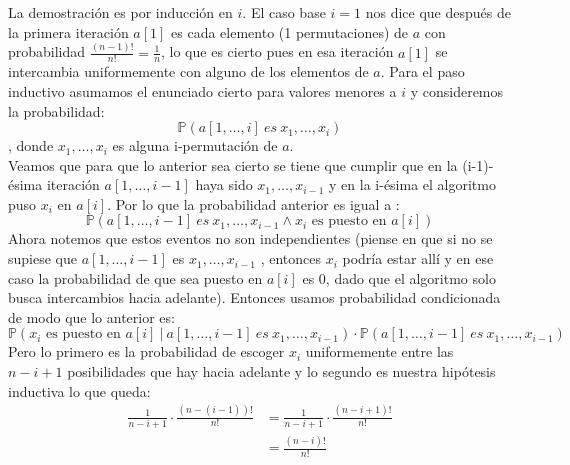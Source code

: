 \documentclass[dcc,uchile]{fcfmcourse}
\begin{document}
\begin{problems}
\begin{enumerate}[a)]
        La demostración es por inducción en $i$. El caso base $i=1$ nos dice que después de la primera iteración $a[1]$ es cada elemento (1 permutaciones) de $a$ con probabilidad $\frac{(n-1)!}{n!} = \frac{1}{n}$, lo que es cierto pues en esa iteración $a[1]$ se intercambia uniformemente con alguno de los elementos de $a$. Para el paso inductivo asumamos el enunciado cierto para valores menores a $i$ y consideremos la probabilidad:
        \begin{equation*}
            \mathbb{P}\left(a[1,\ldots,i]\ es\ x_{1},\ldots,x_{i}\right)
        \end{equation*}
        , donde $x_{1},\ldots,x_{i}$ es alguna i-permutación de $a$.\\
        Veamos que para que lo anterior sea cierto se tiene que cumplir que en la (i-1)-ésima iteración $a[1,\ldots,i-1]$ haya sido $x_{1},\ldots,x_{i-1}$ y en la i-ésima  el algoritmo puso $x_{i}$ en $a[i]$. Por lo que la probabilidad anterior es igual a :
        \begin{equation*}
            \mathbb{P}\left(a[1,\ldots,i-1]\ es\ x_{1},\ldots,x_{i-1} \land \text{$x_{i}$ es puesto en $a[i]$}\right)
        \end{equation*}
        Ahora notemos que estos eventos no son independientes (piense en que si no se supiese que $a[1,\ldots,i-1]$ es $x_{1},\ldots,x_{i-1}$ , entonces $x_{i}$ podría estar allí y en ese caso la probabilidad de que sea puesto en $a[i]$ es 0, dado que el algoritmo solo busca intercambios hacia adelante). Entonces usamos probabilidad condicionada de modo que lo anterior es:
        \begin{equation*}
            \mathbb{P}\left(\text{$x_{i}$ es puesto en $a[i]$}\ |\ a[1,\ldots,i-1]\ es\ x_{1},\ldots,x_{i-1}\right) \cdot \mathbb{P}\left(a[1,\ldots,i-1]\ es\ x_{1},\ldots,x_{i-1}\right)
        \end{equation*}
        Pero lo primero es la probabilidad de escoger $x_{i}$ uniformemente entre las $n-i+1$ posibilidades que hay hacia adelante y lo segundo es nuestra hipótesis inductiva lo que queda:
        \begin{align*}
            \frac{1}{n-i+1}\cdot\frac{(n-(i-1))!}{n!} &= \frac{1}{n-i+1}\cdot\frac{(n-i+1)!}{n!}\\
            &= \frac{(n-i)!}{n!}
        \end{align*}
\end{enumerate}
\\
\begin{enumerate}[a)]

\end{enumerate}
\end{problems}
\end{document}
